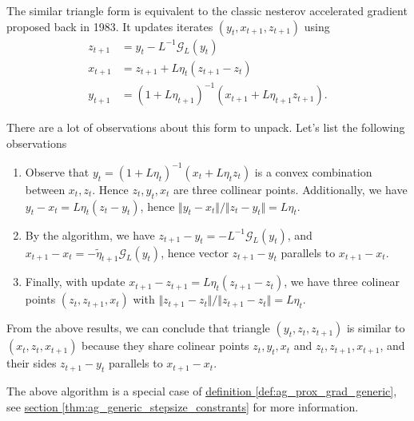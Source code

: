         \begin{definition}
        \label{def:ag_form_similar_tria_I}
            The similar triangle form is equivalent to the classic nesterov accelerated gradient proposed back in 1983. 
            It updates iterates $(y_t, x_{t + 1}, z_{t + 1})$ using 
            \begin{align*}
                z_{t + 1} &= y_t - L^{-1} \mathcal G_L(y_t) 
                \\
                x_{t + 1} &= z_{t + 1} + L\eta_t (z_{t + 1} - z_t)
                \\
                y_{t + 1} &= 
                (1 + L\eta_{t + 1})^{-1}
                (x_{t + 1} + L\eta_{t + 1}z_{t + 1}). 
            \end{align*}
        \end{definition}
        \begin{observation}
            There are a lot of observations about this form to unpack. 
            Let's list the following observations
            \begin{enumerate}
                \item Observe that $y_t = (1 + L\eta_t)^{-1}(x_t + L\eta_t z_t)$ is a convex combination between $x_t, z_t$. Hence $z_t, y_t, x_t$ are three collinear points. Additionally, we have $y_t - x_t = L\eta_t (z_t - y_t)$, hence $\Vert y_t - x_t\Vert/\Vert z_t - y_t\Vert = L\eta_t$. 
                \item By the algorithm, we have $z_{t + 1} - y_t = - L^{-1} \mathcal G_L(y_t)$, and $x_{t + 1} - x_t = - \tilde \eta_{t + 1} \mathcal G_L(y_t)$, hence vector $z_{t + 1} - y_t$ parallels to $x_{t + 1} - x_t$. 
                \item Finally, with update $x_{t +1} - z_{t + 1} = L\eta_t (z_{t +1} - z_t)$, we have three colinear points $(z_t, z_{t + 1}, x_t)$ with $\Vert z_{t + 1} - z_t\Vert/\Vert z_{t +1 } - z_t\Vert = L\eta_t$. 
            \end{enumerate}
            From the above results, we can conclude that triangle $(y_t, z_t, z_{t + 1})$ is similar to $(x_t, z_t, x_{t + 1})$ because they share colinear points $z_t, y_t, x_t$ and $z_t, z_{t + 1}, x_{t + 1}$, and their sides $z_{t + 1} - y_t$ parallels to $x_{t + 1} - x_t$. 
        \end{observation}
        \begin{remark}
            The above algorithm is a special case of 
            \hyperref[def:ag_prox_grad_generic]{definition \ref*{def:ag_prox_grad_generic}}, 
            see 
            \hyperref[thm:ag_generic_stepsize_constrants]{section \ref*{thm:ag_generic_stepsize_constrants}} 
            for more information. 
        \end{remark}

